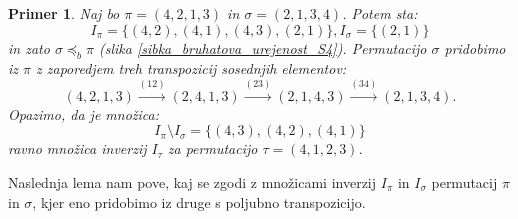 \documentclass[a4paper, 12pt]{book}
\newtheorem{primer}{Primer}[chapter]
\begin{document}
\begin{primer}
\label{primer_nepreimenovanje_elementov_mnozice_inverzij}
    Naj bo $\pi = (4, 2, 1, 3)$ in $\sigma = (2, 1, 3, 4)$. Potem sta:
    \[I_{\pi} = \{ (4, 2), (4, 1), (4, 3), (2, 1) \}, I_{\sigma} = \{ (2, 1) \}\]
    in zato $\sigma \preceq_b \pi$ (slika \ref{sibka_bruhatova_urejenost_S4}). Permutacijo $\sigma$ pridobimo iz $\pi$ z zaporedjem treh transpozicij sosednjih elementov:
    \[
        (4, 2, 1, 3) \overset{(12)}{\rightarrow} (2, 4, 1, 3) \overset{(23)}{\rightarrow} (2, 1, 4, 3) \overset{(34)}{\rightarrow} (2, 1, 3, 4).
    \]
    Opazimo, da je množica:
    \[
        I_{\pi} \setminus I_{\sigma} = \{ (4, 3), (4, 2), (4, 1) \}
    \]
    ravno množica inverzij $I_{\tau}$ za permutacijo $\tau = (4, 1, 2, 3)$.
\end{primer}

Naslednja lema nam pove, kaj se zgodi z množicami inverzij $I_{\pi}$ in $I_{\sigma}$ permutacij $\pi$ in $\sigma$, kjer eno pridobimo iz druge s poljubno transpozicijo.
\end{document}
